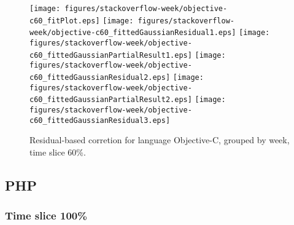 \begin{figure}[hb]
\centering
{}
{\texttt{[image: figures/stackoverflow-week/objective-c60\_fitPlot.eps]}}
{\texttt{[image: figures/stackoverflow-week/objective-c60\_fittedGaussianResidual1.eps]}}
{\texttt{[image: figures/stackoverflow-week/objective-c60\_fittedGaussianPartialResult1.eps]}}
{\texttt{[image: figures/stackoverflow-week/objective-c60\_fittedGaussianResidual2.eps]}}
{\texttt{[image: figures/stackoverflow-week/objective-c60\_fittedGaussianPartialResult2.eps]}}
{\texttt{[image: figures/stackoverflow-week/objective-c60\_fittedGaussianResidual3.eps]}}
\caption{Residual-based corretion for language Objective-C, grouped by week, time slice 60\%.}
\end{figure}


\clearpage 
\newpage 


\subsection{PHP}

\FloatBarrier

\subsubsection{Time slice 100\%}

